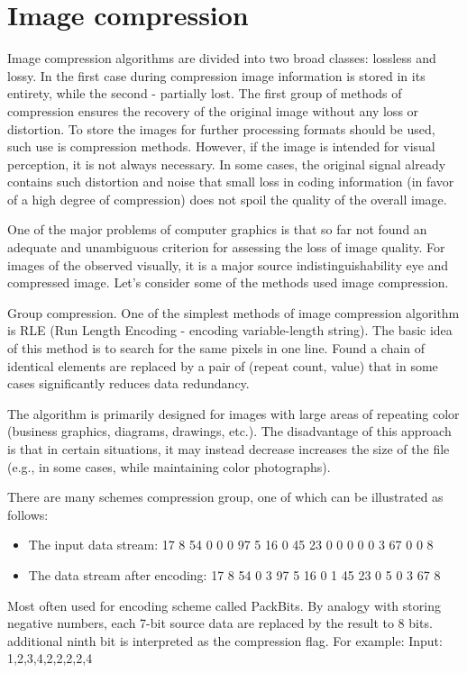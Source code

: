 \section{Image compression}
Image compression algorithms are divided into two broad classes: lossless and lossy. In the first case during compression image information is stored in its entirety, while the second - partially lost. The first group of methods of compression ensures the recovery of the original image without any loss or distortion. To store the images for further processing formats should be used, such use is compression methods. However, if the image is intended for visual perception, it is not always necessary. In some cases, the original signal already contains such distortion and noise that small loss in coding information (in favor of a high degree of compression) does not spoil the quality of the overall image.

One of the major problems of computer graphics is that so far not found an adequate and unambiguous criterion for assessing the loss of image quality. For images of the observed visually, it is a major source indistinguishability eye and compressed image. Let’s consider some of the methods used image compression.

Group compression. One of the simplest methods of image compression algorithm is RLE (Run Length Encoding - encoding variable-length string). The basic idea of this method is to search for the same pixels in one line. Found a chain of identical elements are replaced by a pair of (repeat count, value) that in some cases significantly reduces data redundancy.

The algorithm is primarily designed for images with large areas of repeating color (business graphics, diagrams, drawings, etc.). The disadvantage of this approach is that in certain situations, it may instead decrease increases the size of the file (e.g., in some cases, while maintaining color photographs).

There are many schemes compression group, one of which can be illustrated as follows:
\begin{itemize}
\item The input data stream: 17 8 54 0 0 0 97 5 16 0 45 23 0 0 0 0 0 3 67 0 0 8
\item The data stream after encoding: 17 8 54 0 3 97 5 16 0 1 45 23 0 5 0 3 67 8
\end{itemize}

Most often used for encoding scheme called PackBits. By analogy with storing negative numbers, each 7-bit source data are replaced by the result to 8 bits. additional ninth bit is interpreted as the compression flag. For example:
Input: 1,2,3,4,2,2,2,2,4

